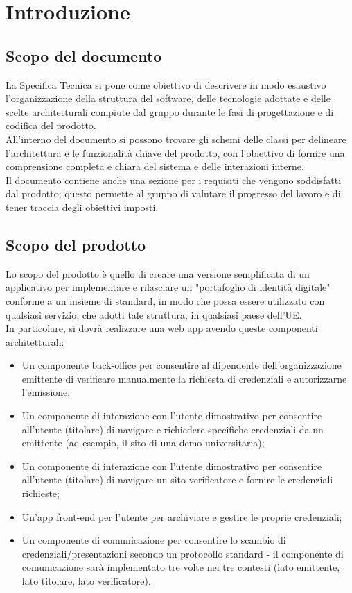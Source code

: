 \section{Introduzione}
\subsection{Scopo del documento}
La Specifica Tecnica si pone come obiettivo di descrivere in modo esaustivo l'organizzazione della struttura del software, delle tecnologie adottate e delle scelte architetturali compiute dal gruppo durante le fasi di progettazione e di codifica del prodotto.\\
All’interno del documento si possono trovare gli schemi delle classi per delineare l'architettura e le funzionalità chiave del prodotto, con l'obiettivo di fornire una comprensione completa e chiara del sistema e delle interazioni interne.\\
Il documento contiene anche una sezione per i requisiti che vengono soddisfatti dal prodotto; questo permette al gruppo  di valutare il progresso del lavoro e di tener traccia degli obiettivi imposti.

\subsection{Scopo del prodotto} 
Lo scopo del prodotto è quello di creare una versione semplificata di un applicativo per implementare e rilasciare un "portafoglio di identità digitale" conforme a un insieme di 
standard, in modo che possa essere utilizzato con qualsiasi servizio, che adotti tale struttura, in qualsiasi paese dell'UE. \\
In particolare, si dovrà realizzare una web app\glo{} avendo queste componenti architetturali:
\begin{itemize}
    \item Un componente back-office per consentire al dipendente dell'organizzazione emittente di verificare\glo{} manualmente la richiesta di credenziali e autorizzarne l'emissione; 
    \item Un componente di interazione con l'utente dimostrativo per consentire all'utente (titolare) di navigare e richiedere specifiche credenziali da un emittente 
(ad esempio, il sito di una demo universitaria); 
    \item Un componente di interazione con l'utente dimostrativo per consentire all'utente (titolare) di navigare un sito verificatore\glo{} e fornire le credenziali richieste;
    \item Un'app front-end per l'utente per archiviare e gestire le proprie credenziali; 
    \item Un componente di comunicazione per consentire lo scambio di credenziali/presentazioni secondo un protocollo standard - il componente di comunicazione sarà implementato 
tre volte nei tre contesti (lato emittente, lato titolare, lato verificatore).
\end{itemize}

